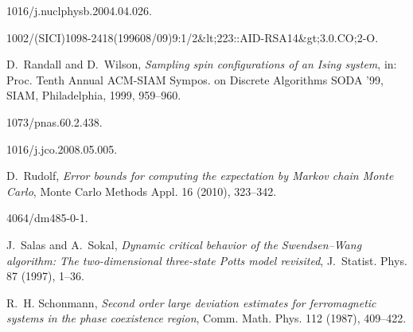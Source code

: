 \documentclass{dis}
\theoremstyle{citing}
\begin{document}
\begin{thebibliography}{10}
{\leavevmode{}1016/j.nuclphysb.2004.04.026}.

{\leavevmode{}1002/(SICI)1098-2418(199608/09)9:1/2&lt;223::AID-RSA14&gt;3.0.CO;2-O}.

D.~Randall and D.~Wilson,
{\em Sampling spin configurations of an Ising system},
in: Proc. Tenth Annual ACM-SIAM Sympos. on
Discrete Algorithms SODA '99, SIAM, Philadelphia, 1999, 959--960.

{\leavevmode{}1073/pnas.60.2.438}.

{\leavevmode{}1016/j.jco.2008.05.005}.

D.~Rudolf,
{\em Error bounds for computing the expectation by {M}arkov chain {M}onte
{C}arlo},
Monte Carlo Methods Appl. {16} (2010), 323--342.

{\leavevmode{}4064/dm485-0-1}.

J.~Salas and A.~Sokal,
{\em Dynamic critical behavior of the {S}wendsen--{W}ang algorithm:  The
two-dimensional three-state {P}otts model revisited},
J.~Statist. Phys. {87} (1997), 1--36.

R.~H. Schonmann,
{\em Second order large deviation estimates for ferromagnetic systems in
the phase coexistence region},
Comm. Math. Phys. {112} (1987), 409--422.


\end{thebibliography}
\end{document}
